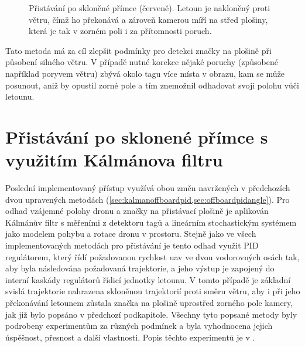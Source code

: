 \begin{figure}
            \caption[Přistávání po skloněné přímce]{Přistávání po skloněné přímce (červeně). Letoun je nakloněný proti větru, čímž ho překonává a zároveň kamerou míří na střed plošiny, která je tak v zorném poli i za přítomnosti poruch.}
            \label{fig:offboardpidangle}
        \end{figure}
        

        Tato metoda má za cíl zlepšit podmínky pro detekci značky na plošině při působení silného větru. V případě nutné korekce nějaké poruchy (způsobené například poryvem větru) zbývá okolo tagu více místa v obrazu, kam se může posunout, aniž by opustil zorné pole a tím znemožnil odhadovat svoji polohu vůči letounu.
    \section{Přistávání po sklonené přímce s využitím Kálmánova filtru} \label{sec:kalmanoffboardpidangle}
        Poslední implementovaný přístup využívá obou změn navržených v předchozích dvou upravených metodách (\cref{sec:kalmanoffboardpid,sec:offboardpidangle}). Pro odhad vzájemné polohy dronu a značky na přistávací plošině je aplikován Kálmánův filtr s měřeními z detektoru tagů a lineárním stochastickým systémem jako modelem pohybu a rotace dronu v prostoru. Stejně jako ve všech implementovaných metodách pro přistávání je tento odhad využit PID regulátorem, který řídí požadovanou rychlost \acrshort{uav} ve dvou vodorovných osách tak, aby byla následována požadovaná trajektorie, a jeho výstup je zapojený do interní kaskády regulátorů řídicí jednotky letounu. V tomto případě je základní svislá trajektorie nahrazena skloněnou trajektorií proti směru větru, aby i při jeho překonávání letounem zůstala značka na plošině uprostřed zorného pole kamery, jak již bylo popsáno v předchozí podkapitole. Všechny tyto popsané metody byly podrobeny experimentům za různých podmínek a byla vyhodnocena jejich úspěšnost, přesnost a další vlastnosti. Popis těchto experimentů je v .